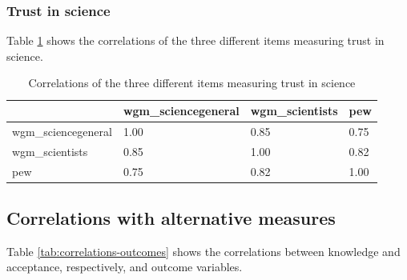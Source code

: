 \documentclass[
  doc,floatsintext]{apa6}
\begin{document}
\subsubsection{Trust in science}\label{trust-in-science-1}

Table \ref{tab:correlation-trust} shows the correlations of the three different items measuring trust in science.

\begin{table}[h]

\begin{center}
\begin{threeparttable}

\caption{\label{tab:correlation-trust}Correlations of the three different items measuring trust in science}

\begin{tabular}{llll}
\toprule
 & \multicolumn{1}{c}{wgm\_sciencegeneral} & \multicolumn{1}{c}{wgm\_scientists} & \multicolumn{1}{c}{pew}\\
\midrule
wgm\_sciencegeneral & 1.00 & 0.85 & 0.75\\
wgm\_scientists & 0.85 & 1.00 & 0.82\\
pew & 0.75 & 0.82 & 1.00\\
\bottomrule
\end{tabular}

\end{threeparttable}
\end{center}

\end{table}

\subsection{Correlations with alternative measures}\label{correlations-with-alternative-measures}

Table \ref{tab:correlations-outcomes} shows the correlations between knowledge and acceptance, respectively, and outcome variables.
\end{document}

